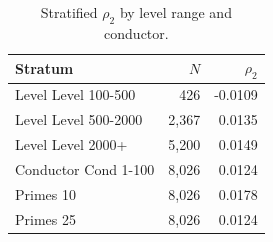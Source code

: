 \begin{table}[h]
\centering
\caption{Stratified $\rho_2$ by level range and conductor.}
\label{tab:galois-stratified}
\begin{tabular}{lrr}
\toprule
Stratum & $N$ & $\rho_2$ \\
\midrule
Level Level 100-500 & 426 & -0.0109 \\
Level Level 500-2000 & 2,367 & 0.0135 \\
Level Level 2000+ & 5,200 & 0.0149 \\
Conductor Cond 1-100 & 8,026 & 0.0124 \\
Primes 10 & 8,026 & 0.0178 \\
Primes 25 & 8,026 & 0.0124 \\
\bottomrule
\end{tabular}
\end{table}
